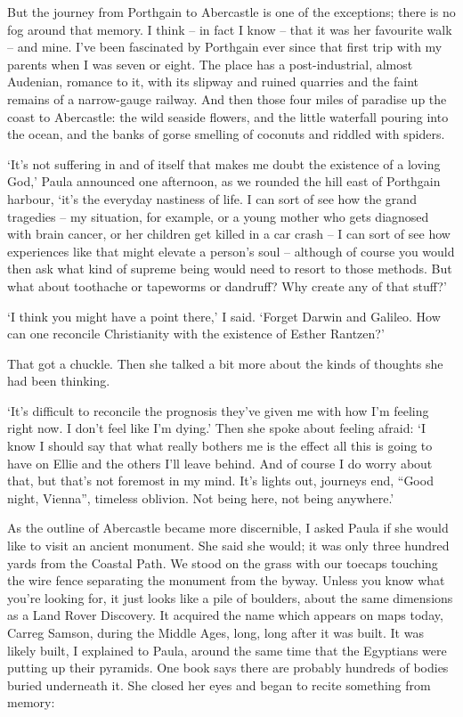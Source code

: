 But the journey from Porthgain to Abercastle is one of the exceptions; there is no fog around that memory. I think -- in fact I know -- that it was her favourite walk -- and mine. I've been fascinated by Porthgain ever since that first trip with my parents when I was seven or eight. The place has a post-industrial, almost Audenian, romance to it, with its slipway and ruined quarries and the faint remains of a narrow-gauge railway. And then those four miles of paradise up the coast to Abercastle: the wild seaside flowers, and the little waterfall pouring into the ocean, and the banks of gorse smelling of coconuts and riddled with spiders.

`It's not suffering in and of itself that makes me doubt the existence of a loving God,' Paula announced one afternoon, as we rounded the hill east of Porthgain harbour, `it's the everyday nastiness of life. I can sort of see how the grand tragedies -- my situation, for example, or a young mother who gets diagnosed with brain cancer, or her children get killed in a car crash -- I can sort of see how experiences like that might elevate a person's soul -- although of course you would then ask what kind of supreme being would need to resort to those methods. But what about toothache or tapeworms or dandruff? Why create any of that stuff?'

`I think you might have a point there,' I said. `Forget Darwin and Galileo. How can one reconcile Christianity with the existence of Esther Rantzen?'

That got a chuckle. Then she talked a bit more about the kinds of thoughts she had been thinking.

`It's difficult to reconcile the prognosis they've given me with how I'm feeling right now. I don't feel like I'm dying.' Then she spoke about feeling afraid: `I know I should say that what really bothers me is the effect all this is going to have on Ellie and the others I'll leave behind. And of course I do worry about that, but that's not foremost in my mind. It's lights out, journeys end, ``Good night, Vienna'', timeless oblivion. Not being here, not being anywhere.'

As the outline of Abercastle became more discernible, I asked Paula if she would like to visit an ancient monument. She said she would; it was only three hundred yards from the Coastal Path. We stood on the grass with our toecaps touching the wire fence separating the monument from the byway. Unless you know what you're looking for, it just looks like a pile of boulders, about the same dimensions as a Land Rover Discovery. It acquired the name which appears on maps today, Carreg Samson, during the Middle Ages, long, long after it was built. It was likely built, I explained to Paula, around the same time that the Egyptians were putting up their pyramids. One book says there are probably hundreds of bodies buried underneath it. She closed her eyes and began to recite something from memory:

